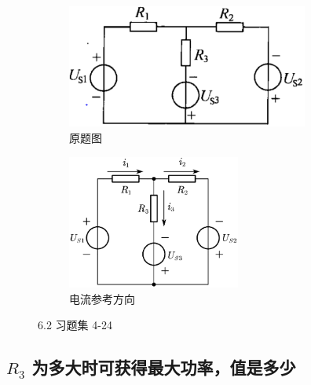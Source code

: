 \documentclass[UTF8]{report}
\theoremstyle{MyLineTheoremStyle} %
\theoremstyle{MyBlockTheoremStyle} %
\theoremstyle{MySubsubsectionStyle} %
\begin{document}
\begin{figure}[H]\centering
\begin{subfigure}[t]{0.55\columnwidth}\centering
    \includegraphics[height=115pt]{assets/6/a45e47a606698b8a935641ad6e1e5ab9.png}
    \caption{ 原题图 }
\end{subfigure}\hfill
\begin{subfigure}[t]{0.45\columnwidth}\centering
    \includegraphics[height=125pt]{assets/6/0d7f9f1c42f022fbf24925b67ee966d3.png}
    \caption{ 电流参考方向 }
\end{subfigure}
\caption{ 6.2 习题集 4-24}\label{6.2 习题集 4-24}
\end{figure}

\subsection{$R_3$ 为多大时可获得最大功率，值是多少}
\end{document}
